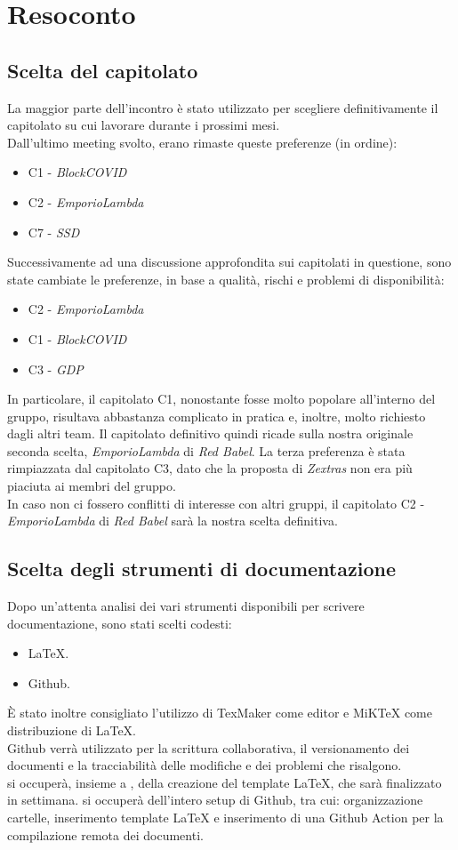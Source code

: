 \section{Resoconto}
\subsection{Scelta del capitolato}
La maggior parte dell'incontro è stato utilizzato per scegliere definitivamente il capitolato su cui lavorare durante i prossimi mesi.\\
Dall'ultimo meeting svolto, erano rimaste queste preferenze (in ordine):
\begin{itemize}
\item C1 - \textit{BlockCOVID}
\item C2 - \textit{EmporioLambda}
\item C7 - \textit{SSD}
\end{itemize}
Successivamente ad una discussione approfondita sui capitolati in questione, sono state cambiate le preferenze, in base a qualità, rischi e problemi di disponibilità:
\begin{itemize}
\item C2 - \textit{EmporioLambda}
\item C1 - \textit{BlockCOVID}
\item C3 - \textit{GDP}
\end{itemize}
In particolare, il capitolato C1, nonostante fosse molto popolare all'interno del gruppo, risultava abbastanza complicato in pratica e, inoltre, molto richiesto dagli altri team. Il capitolato definitivo quindi ricade sulla nostra originale seconda scelta, \textit{EmporioLambda} di \textit{Red Babel}. La terza preferenza è stata rimpiazzata dal capitolato C3, dato che la proposta di \textit{Zextras} non era più piaciuta ai membri del gruppo.\\
In caso non ci fossero conflitti di interesse con altri gruppi, il capitolato C2 - \textit{EmporioLambda} di \textit{Red Babel} sarà la nostra scelta definitiva.
\subsection{Scelta degli strumenti di documentazione}
Dopo un'attenta analisi dei vari strumenti disponibili per scrivere documentazione, sono stati scelti codesti:
\begin{itemize}
\item LaTeX.
\item Github.
\end{itemize}
È stato inoltre consigliato l'utilizzo di TexMaker come editor e MiKTeX come distribuzione di LaTeX.\\
Github verrà utilizzato per la scrittura collaborativa, il versionamento dei documenti e la tracciabilità delle modifiche e dei problemi che risalgono.\\
\SB{} si occuperà, insieme a \NM{}, della creazione del template LaTeX, che sarà finalizzato in settimana.
\NM{} si occuperà dell'intero setup di Github, tra cui: organizzazione cartelle, inserimento template LaTeX e inserimento di una Github Action per la compilazione remota dei documenti.
